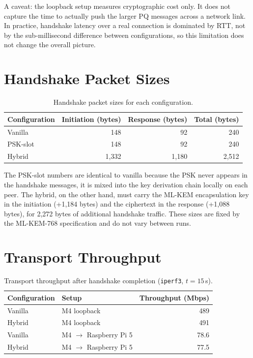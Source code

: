 A caveat: the loopback setup measures cryptographic cost only. It does not capture the time to actually push the larger PQ messages across a network link. In practice, handshake latency over a real connection is dominated by RTT, not by the sub-millisecond difference between configurations, so this limitation does not change the overall picture.

\section{Handshake Packet Sizes}

\begin{table}[H]
\centering
\caption{Handshake packet sizes for each configuration.}
\label{tab:packet_sizes}
\begin{tabular}{@{}lrrr@{}}
\toprule
\textbf{Configuration} & \textbf{Initiation (bytes)} & \textbf{Response (bytes)} & \textbf{Total (bytes)} \\
\midrule
Vanilla   & 148       & 92        & 240 \\
PSK-slot  & 148       & 92        & 240 \\
Hybrid    & 1,332 & 1,180 & 2,512 \\
\bottomrule
\end{tabular}
\end{table}

The PSK-slot numbers are identical to vanilla because the PSK never appears in the handshake messages, it is mixed into the key derivation chain locally on each peer. The hybrid, on the other hand, must carry the ML-KEM encapsulation key in the initiation (+1,184 bytes) and the ciphertext in the response (+1,088 bytes), for 2,272 bytes of additional handshake traffic. These sizes are fixed by the ML-KEM-768 specification and do not vary between runs.

\section{Transport Throughput}

\begin{table}[H]
\centering
\caption{Transport throughput after handshake completion (\texttt{iperf3}, $t = 15$\,s).}
\label{tab:throughput}
\begin{tabular}{@{}llr@{}}
\toprule
\textbf{Configuration} & \textbf{Setup} & \textbf{Throughput (Mbps)} \\
\midrule
Vanilla & M4 loopback             & 489 \\
Hybrid  & M4 loopback             & 491 \\
\midrule
Vanilla & M4 $\rightarrow$ Raspberry Pi 5  & 78.6 \\
Hybrid  & M4 $\rightarrow$ Raspberry Pi 5  & 77.5 \\
\bottomrule
\end{tabular}
\end{table}

